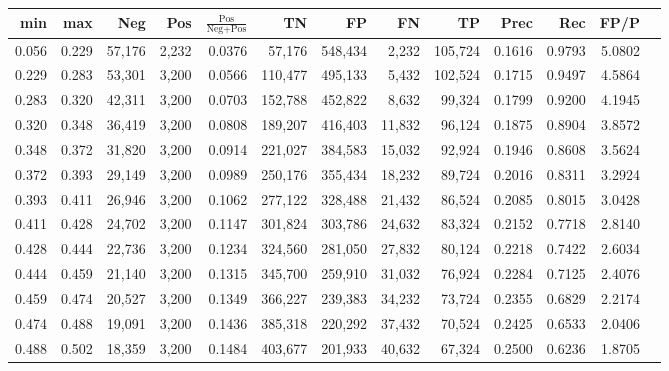 \begin{tabular}{rrrrrrrrrrrrr}
\toprule
  min &   max &    Neg &   Pos & $\frac{\text{Pos}}{\text{Neg}+\text{Pos}}$ &      TN &      FP &      FN &      TP &   Prec &    Rec &   FP/P \\
\midrule
0.056 & 0.229 & 57,176 & 2,232 &                                     0.0376 &  57,176 & 548,434 &   2,232 & 105,724 & 0.1616 & 0.9793 & 5.0802 \\
0.229 & 0.283 & 53,301 & 3,200 &                                     0.0566 & 110,477 & 495,133 &   5,432 & 102,524 & 0.1715 & 0.9497 & 4.5864 \\
0.283 & 0.320 & 42,311 & 3,200 &                                     0.0703 & 152,788 & 452,822 &   8,632 &  99,324 & 0.1799 & 0.9200 & 4.1945 \\
0.320 & 0.348 & 36,419 & 3,200 &                                     0.0808 & 189,207 & 416,403 &  11,832 &  96,124 & 0.1875 & 0.8904 & 3.8572 \\
0.348 & 0.372 & 31,820 & 3,200 &                                     0.0914 & 221,027 & 384,583 &  15,032 &  92,924 & 0.1946 & 0.8608 & 3.5624 \\
0.372 & 0.393 & 29,149 & 3,200 &                                     0.0989 & 250,176 & 355,434 &  18,232 &  89,724 & 0.2016 & 0.8311 & 3.2924 \\
0.393 & 0.411 & 26,946 & 3,200 &                                     0.1062 & 277,122 & 328,488 &  21,432 &  86,524 & 0.2085 & 0.8015 & 3.0428 \\
0.411 & 0.428 & 24,702 & 3,200 &                                     0.1147 & 301,824 & 303,786 &  24,632 &  83,324 & 0.2152 & 0.7718 & 2.8140 \\
0.428 & 0.444 & 22,736 & 3,200 &                                     0.1234 & 324,560 & 281,050 &  27,832 &  80,124 & 0.2218 & 0.7422 & 2.6034 \\
0.444 & 0.459 & 21,140 & 3,200 &                                     0.1315 & 345,700 & 259,910 &  31,032 &  76,924 & 0.2284 & 0.7125 & 2.4076 \\
0.459 & 0.474 & 20,527 & 3,200 &                                     0.1349 & 366,227 & 239,383 &  34,232 &  73,724 & 0.2355 & 0.6829 & 2.2174 \\
0.474 & 0.488 & 19,091 & 3,200 &                                     0.1436 & 385,318 & 220,292 &  37,432 &  70,524 & 0.2425 & 0.6533 & 2.0406 \\
0.488 & 0.502 & 18,359 & 3,200 &                                     0.1484 & 403,677 & 201,933 &  40,632 &  67,324 & 0.2500 & 0.6236 & 1.8705 \\

\end{tabular}
